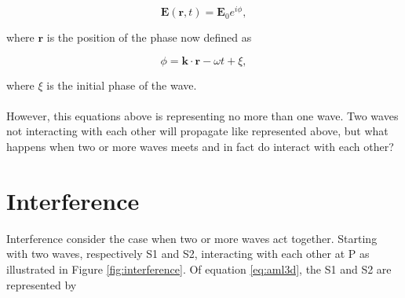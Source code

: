 \begin{equation}
    \textbf{E}(\textbf{r},t) = \textbf{E}_0 e^{i \phi},
    \label{eq:aml3d}
\end{equation}

where $\textbf{r}$ is the position of the phase now defined as 

\begin{equation}
    \phi = \textbf{k}\cdot \textbf{r} - \omega t + \xi,
    \label{eq:phase}
\end{equation}

where $\xi$ is the initial phase of the wave. 
\\\\
However, this equations above is representing no more than one wave. Two waves not interacting with each other will propagate like represented above, but what happens when two or more waves meets and in fact do interact with each other? 

\vspace{1.3cm}
\section{Interference}
Interference consider the case when two or more waves act together. Starting with two waves, respectively S1 and S2, interacting with each other at P as illustrated in Figure \ref{fig:interference}. Of equation \ref{eq:aml3d}, the S1 and S2 are represented by

